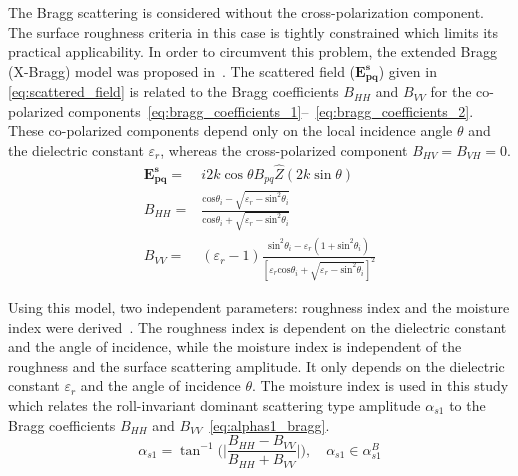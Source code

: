 The Bragg scattering is considered without the cross-polarization component. The surface roughness criteria in this case is tightly constrained which limits its practical  applicability. In order to circumvent this problem, the extended Bragg (X-Bragg) model was proposed in~\cite{Hajnsek2003}. The scattered field ($\mathbf{E_{pq}^s}$) given in \eqref{eq:scattered_field} is related to the Bragg coefficients $B_{HH}$ and $B_{VV}$ for the co-polarized components~\eqref{eq:bragg_coefficients_1}--~\eqref{eq:bragg_coefficients_2}. These co-polarized components depend only on the local incidence angle $\theta$ and the dielectric constant $\varepsilon_{r}$, whereas the cross-polarized component $B_{HV}=B_{VH}=0$. 
\begin{subequations}
	\begin{align}
	\mathbf{E_{pq}^s} = & i2k\cos\theta B_{pq}\hat{Z}(2k\sin\theta)
	\label{eq:scattered_field} \\
	B_{HH} = & \frac{\mbox{cos}\theta_{i} - \sqrt{\varepsilon_{r} - \mbox{sin}^2\theta_{i}}}{\mbox{cos}\theta_{i} + \sqrt{\varepsilon_{r} - \mbox{sin}^2\theta_{i}}} \label{eq:bragg_coefficients_1}\\
	B_{VV} = & (\varepsilon_{r}-1)\frac{\mbox{sin}^2\theta_{i} - \varepsilon_{r}(1 + \mbox{sin}^2\theta_{i})}{\left[\varepsilon_{r}\mbox{cos}\theta_{i} + \sqrt{\varepsilon_{r} - \mbox{sin}^2\theta_{i}}\right]^2} \label{eq:bragg_coefficients_2} 
	\end{align}
\end{subequations}

Using this model, two independent parameters: roughness index and the moisture index were derived~\citep{cloude2002new}. The roughness index is dependent on the dielectric constant and the angle of incidence, while the moisture index is independent of the roughness and the surface scattering amplitude. It only depends on the dielectric constant $\varepsilon_{r}$ and the angle of incidence $\theta$. The moisture index is used in this study which relates the roll-invariant dominant scattering type amplitude $\alpha_{s1}$ to the Bragg coefficients $B_{HH}$ and $B_{VV}$~\eqref{eq:alphas1_bragg}.
\begin{equation}
\alpha_{s1}=\tan^{-1}\Bigg(\Bigg|\frac{B_{HH}-B_{VV}}{B_{HH}+B_{VV}}\Bigg|\Bigg), \quad \alpha_{s1} \in \alpha_{s1}^{B}
\label{eq:alphas1_bragg}
\end{equation}

